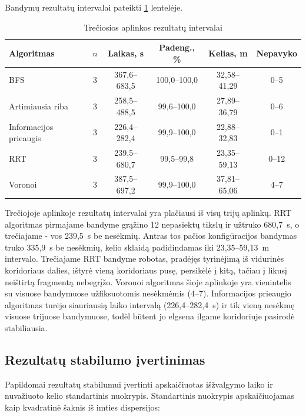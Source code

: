 \documentclass[]{VUMIFTemplateClass}
\begin{document}
Bandymų rezultatų intervalai pateikti \ref{tab:results-room3-disp} lentelėje.

\begin{table}[H]
\centering
\caption{Trečiosios aplinkos rezultatų intervalai}
\label{tab:results-room3-disp}
\small
\setlength{\tabcolsep}{3pt}
\begin{tabular}{|l|c|c|c|c|c|}
\hline
\textbf{Algoritmas} & \textbf{$n$} & \textbf{Laikas, s} & \textbf{Padeng., \%} & \textbf{Kelias, m} & \textbf{Nepavyko} \\
\hline
BFS & 3 & 367,6--683,5 & 100,0--100,0 & 32,58--41,29 & 0--5 \\
\hline
Artimiausia riba & 3 & 258,5--488,5 & 99,6--100,0 & 27,89--36,79 & 0--6 \\
\hline
Informacijos prieaugis & 3 & 226,4--282,4 & 99,9--100,0 & 22,88--32,83 & 0--1 \\
\hline
RRT & 3 & 239,5--680,7 & 99,5--99,8 & 23,35--59,13 & 0--12 \\
\hline
Voronoi & 3 & 387,5--697,2 & 99,9--100,0 & 37,81--65,06 & 4--7 \\
\hline
\end{tabular}
\end{table}

Trečiojoje aplinkoje rezultatų intervalai yra plačiausi iš visų trijų aplinkų. RRT algoritmas pirmajame bandyme grąžino 12 nepasiektų tikslų ir užtruko 680,7~s, o
trečiajame - vos 239,5~s be nesėkmių. Antras tos pačios konfigūracijos bandymas truko 335,9~s be nesėkmių, kelio sklaidą padidindamas iki 23,35--59,13~m
intervalo. Trečiajame RRT bandyme robotas, pradėjęs tyrinėjimą iš vidurinės koridoriaus dalies, ištyrė vieną koridoriaus pusę, persikėlė į kitą, tačiau į likusį
neištirtą fragmentą nebegrįžo. Voronoi algoritmas šioje aplinkoje yra vienintelis su visuose bandymuose užfiksuotomis nesėkmėmis (4--7). Informacijos prieaugio algoritmas turėjo siauriausią laiko intervalą
(226,4--282,4~s) ir tik vieną nesėkmę visuose trijuose bandymuose, todėl būtent jo elgsena ilgame koridoriuje pasirodė stabiliausia.

\subsection{Rezultatų stabilumo įvertinimas}

Papildomai rezultatų stabilumui įvertinti apskaičiuotas išžvalgymo laiko ir nuvažiuoto kelio standartinis nuokrypis. Standartinis nuokrypis apskaičiuojamas
kaip kvadratinė šaknis iš imties dispersijos:
\end{document}
